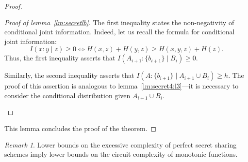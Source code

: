 \documentclass[12pt,sans]{article}
\theoremstyle{definition}
\theoremstyle{plain}
\theoremstyle{remark}
\newtheorem{remark}{Remark}[section]
\begin{document}
\begin{proof}
\begin{proof}[Proof of lemma~\ref{lm:secretlb}]
        The first inequality states the non-negativity of conditional joint information.
        Indeed, let us recall the formula for conditional joint information:
        \[
        I(x:y \mid z) \ge 0 \iff H(x,z) + H(y,z) \ge H(x,y,z) + H(z).
        \]
        Thus, the first inequality asserts that $I(A_{i+1} : \{b_{i+1}\} \mid B_i) \ge 0$.

        Similarly, the second inequality asserts that $I(A : \{b_{i+1}\} \mid A_{i+1} \cup B_i) \ge h$.
        The proof of this assertion is analogous to lemma~\ref{lm:secret4:l3}—it is necessary to consider the conditional distribution given $A_{i+1} \cup B_i$.
        \begin{center}
        \end{center}
    \end{proof}
    This lemma concludes the proof of the theorem.
\end{proof}

\begin{remark}
    Lower bounds on the excessive complexity of perfect secret sharing schemes imply lower bounds on the circuit complexity of monotonic functions.
\end{remark}
\end{document}
